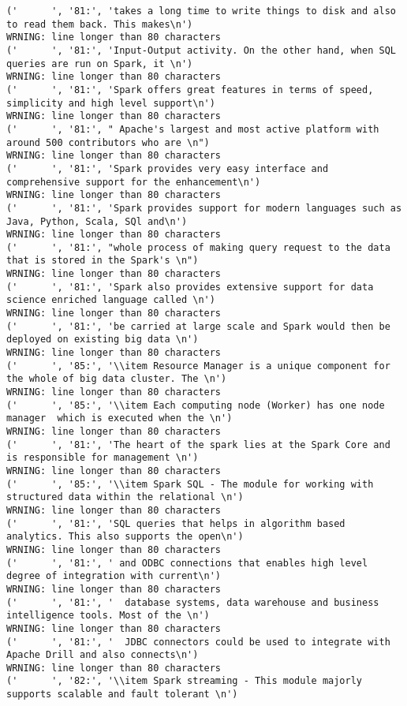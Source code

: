 \begin{tiny}
\begin{verbatim}
('      ', '81:', 'takes a long time to write things to disk and also to read them back. This makes\n')
WRNING: line longer than 80 characters
('      ', '81:', 'Input-Output activity. On the other hand, when SQL queries are run on Spark, it \n')
WRNING: line longer than 80 characters
('      ', '81:', 'Spark offers great features in terms of speed, simplicity and high level support\n')
WRNING: line longer than 80 characters
('      ', '81:', " Apache's largest and most active platform with around 500 contributors who are \n")
WRNING: line longer than 80 characters
('      ', '81:', 'Spark provides very easy interface and comprehensive support for the enhancement\n')
WRNING: line longer than 80 characters
('      ', '81:', 'Spark provides support for modern languages such as Java, Python, Scala, SQl and\n')
WRNING: line longer than 80 characters
('      ', '81:', "whole process of making query request to the data that is stored in the Spark's \n")
WRNING: line longer than 80 characters
('      ', '81:', 'Spark also provides extensive support for data science enriched language called \n')
WRNING: line longer than 80 characters
('      ', '81:', 'be carried at large scale and Spark would then be deployed on existing big data \n')
WRNING: line longer than 80 characters
('      ', '85:', '\\item Resource Manager is a unique component for the whole of big data cluster. The \n')
WRNING: line longer than 80 characters
('      ', '85:', '\\item Each computing node (Worker) has one node manager  which is executed when the \n')
WRNING: line longer than 80 characters
('      ', '81:', 'The heart of the spark lies at the Spark Core and is responsible for management \n')
WRNING: line longer than 80 characters
('      ', '85:', '\\item Spark SQL - The module for working with structured data within the relational \n')
WRNING: line longer than 80 characters
('      ', '81:', 'SQL queries that helps in algorithm based analytics. This also supports the open\n')
WRNING: line longer than 80 characters
('      ', '81:', ' and ODBC connections that enables high level degree of integration with current\n')
WRNING: line longer than 80 characters
('      ', '81:', '  database systems, data warehouse and business intelligence tools. Most of the \n')
WRNING: line longer than 80 characters
('      ', '81:', '  JDBC connectors could be used to integrate with Apache Drill and also connects\n')
WRNING: line longer than 80 characters
('      ', '82:', '\\item Spark streaming - This module majorly supports scalable and fault tolerant \n')

\end{verbatim}
\end{tiny}
